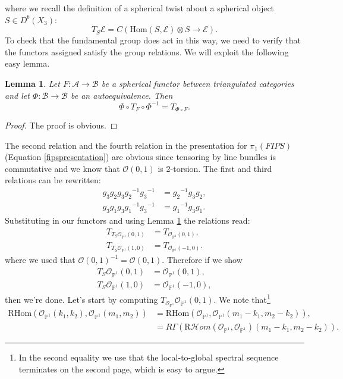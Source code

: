 \documentclass[oneside,reqno]{amsart}
\newtheorem{lemma}{Lemma} [section]
\theoremstyle{definition}
\theoremstyle{definition}
\theoremstyle{definition}
\theoremstyle{definition}
\newcommand{\PP}{\mathbb{P}}
\newcommand{\Os}{\mathcal{O}}
\newcommand{\Es}{\mathcal{E}}
\begin{document}
where we recall the definition of a spherical twist about a spherical object $S \in D^b(X_3)$:
\begin{equation*}
     T_{S}\Es =C\left(\text{Hom}(S,\Es )\otimes S \to \Es  \right).
\end{equation*}
To check that the fundamental group does act in this way, we need to verify that the functors assigned satisfy the group relations. We will exploit the following easy lemma.
\begin{lemma}
    \label{twistrels}
    Let $F : \mathcal{A} \to \mathcal{B}$ be a spherical functor between triangulated categories and let $\Phi : \mathcal{B} \to \mathcal{B}$ be an autoequivalence. Then
    $$
    \Phi \circ T_F \circ  \Phi^{-1} = T_{\Phi \circ F}.
    $$
\end{lemma}
\begin{proof}
    The proof is obvious.
\end{proof}
The second relation and the fourth relation in the presentation for $\pi_1(FIPS)$ (Equation \eqref{fipspresentation}) are obvious since tensoring by line bundles is commutative and we know that $\Os(0,1)$ is 2-torsion. The first and third relations can be rewritten:
\begin{align*}
    g_3 g_2 g_3 {g_2}^{-1} {g_3}^{-1} &= {g_2}^{-1}g_3 g_2,\\
    g_3 g_1 g_3 {g_1}^{-1} {g_3}^{-1} &= {g_1}^{-1}g_3 g_1 .
\end{align*}
Substituting in our functors and using Lemma \ref{twistrels} the relations read:
\begin{align*}
    T_{T_{S} {\Os_{\PP^1}(0,1)}} &= T_{\Os_{\PP^1}(0,1)},\\
    T_{T_{S} \Os_{\PP^1}(1,0)} &= T_{\Os_{\PP^1}(-1,0)}.
\end{align*}
where we used that $\Os(0,1)^{-1} = \Os(0,1)$. Therefore if we show
\begin{align}
    T_{S} \Os_{\PP^1}(0,1)&= \Os_{\PP^1}(0,1), 
    \label{rel1}\\
    \label{rel2} T_{S} \Os_{\PP^1}(1,0) &= \Os_{\PP^1}(-1,0),
\end{align}
then we're done. Let's start by computing $T_{\Os_{\PP^1}}\Os_{\PP^1}(0,1)$. We note that\footnote{In the second equality we use that the local-to-global spectral sequence terminates on the second page, which is easy to argue.}
\begin{align*}
    \text{RHom}(\Os_{\PP^1}(k_1, k_2),\Os_{\PP^1}(m_1,m_2)) &= \text{RHom}(\Os_{\PP^1},\Os_{\PP^1}(m_1 - k_1, m_2 - k_2)), \\
    &=R\Gamma \left(\text{R}\mathcal{H}om(\Os_{\PP^1},\Os_{\PP^1})(m_1 - k_1, m_2 - k_2) \right).
\end{align*}
\end{document}
